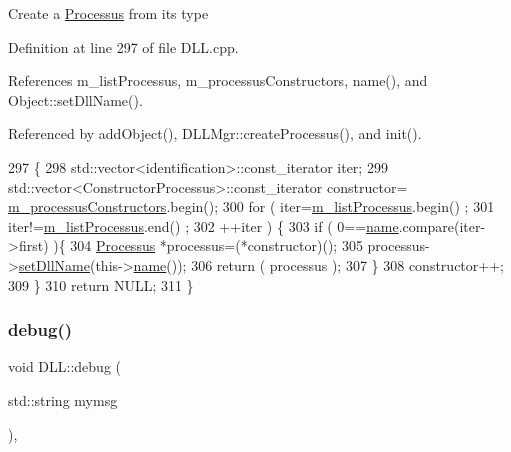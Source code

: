Create a \hyperlink{classProcessus}{Processus} from its type 

Definition at line 297 of file D\+L\+L.\+cpp.



References m\+\_\+list\+Processus, m\+\_\+processus\+Constructors, name(), and Object\+::set\+Dll\+Name().



Referenced by add\+Object(), D\+L\+L\+Mgr\+::create\+Processus(), and init().


\begin{DoxyCode}
297                                                  \{
298   std::vector<identification>::const\_iterator iter;
299   std::vector<ConstructorProcessus>::const\_iterator constructor=
      \hyperlink{classDLL_af9b49d23b767b742e38a7286de8e7c4d}{m\_processusConstructors}.begin();
300   \textcolor{keywordflow}{for} ( iter=\hyperlink{classDLL_a197e92b990184a27a74f4a0456897bd5}{m\_listProcessus}.begin() ;
301         iter!=\hyperlink{classDLL_a197e92b990184a27a74f4a0456897bd5}{m\_listProcessus}.end() ;
302         ++iter ) \{
303     \textcolor{keywordflow}{if} ( 0==\hyperlink{classDLL_a0a915d538771dde2cb0580cd340ee088}{name}.compare(iter->first) )\{
304       \hyperlink{classProcessus}{Processus} *processus=(*constructor)();
305       processus->\hyperlink{classObject_a870c5af919958c2136623b2d7816d123}{setDllName}(this->\hyperlink{classDLL_a0a915d538771dde2cb0580cd340ee088}{name}());
306       \textcolor{keywordflow}{return} ( processus );
307     \}
308     constructor++;
309   \}
310   \textcolor{keywordflow}{return} NULL;
311 \}
\end{DoxyCode}
\mbox{\label{classDLL_ab3fb4a13b4308047d42b27b6943a47da}} 
\subsubsection{\texorpdfstring{debug()}{debug()}\hspace{0.1cm}{\footnotesize\ttfamily [1/2]}}
{\footnotesize\ttfamily void D\+L\+L\+::debug (\begin{DoxyParamCaption}\item[{std\+::string}]{mymsg }\end{DoxyParamCaption})\hspace{0.3cm}{\ttfamily [inline]}, {\ttfamily [private]}}



